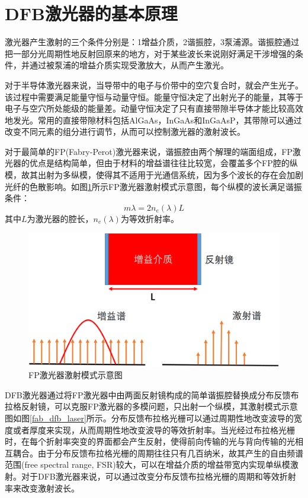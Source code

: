 \section{DFB激光器的基本原理}

激光器产生激射的三个条件分别是：1增益介质，2谐振腔，3泵浦源。谐振腔通过把一部分光周期性地反射回原来的地方，对于某些波长来说刚好满足干涉增强的条件，并通过被泵浦的增益介质实现受激放大，从而产生激光\cite{numai2015fundamentals,suhara2004semiconductor}。

对于半导体激光器来说，当导带中的电子与价带中的空穴复合时，就会产生光子。该过程中需要满足能量守恒与动量守恒。能量守恒决定了出射光子的能量，其等于电子与空穴所处能级的能量差。动量守恒决定了只有直接带隙半导体才能比较高效地发光。常用的直接带隙材料包括AlGaAs，InGaAs和InGaAsP，其带隙可以通过改变不同元素的组分进行调节，从而可以控制激光器的激射波长。

对于最简单的FP(Fabry-Perot)激光器来说，谐振腔由两个解理的端面组成，FP激光器的优点是结构简单，但由于材料的增益谱往往比较宽，会覆盖多个FP腔的纵模，故其出射为多纵模，使得其不适用于光通信系统，因为多个波长的存在会加剧光纤的色散影响。如图\ref{fab_fp_laser}所示FP激光器激射模式示意图，每个纵模的波长满足谐振条件：
\begin{equation}
m\lambda = 2n_e(\lambda)L
\end{equation}
其中$L$为激光器的腔长，$n_e(\lambda)$为等效折射率。

\begin{figure}[htb]
	\centering
	\includegraphics[width=12cm]{./Pictures/fab_fp_laser.jpg}
	\captionsetup{justification=centering}
	\caption{FP激光器激射模式示意图}
	\label{fab_fp_laser}
\end{figure}

DFB激光器通过将FP激光器中由两面反射镜构成的简单谐振腔替换成分布反馈布拉格反射镜，可以克服FP激光器的多模问题，只出射一个纵模，其激射模式示意图如图\ref{fab_dfb_laser}所示。分布反馈布拉格光栅可以通过周期性地改变波导的宽度或者厚度来实现，从而周期性地改变波导的等效折射率。当光经过布拉格光栅时，在每个折射率突变的界面都会产生反射，使得前向传输的光与背向传输的光相互耦合。由于分布反馈布拉格光栅的周期往往只有几百纳米，故其产生的自由频谱范围(free spectral range, FSR)较大，可以在增益介质的增益带宽内实现单纵模激射。对于DFB激光器来说，可以通过改变分布反馈布拉格光栅的周期和等效折射率来改变激射波长。

